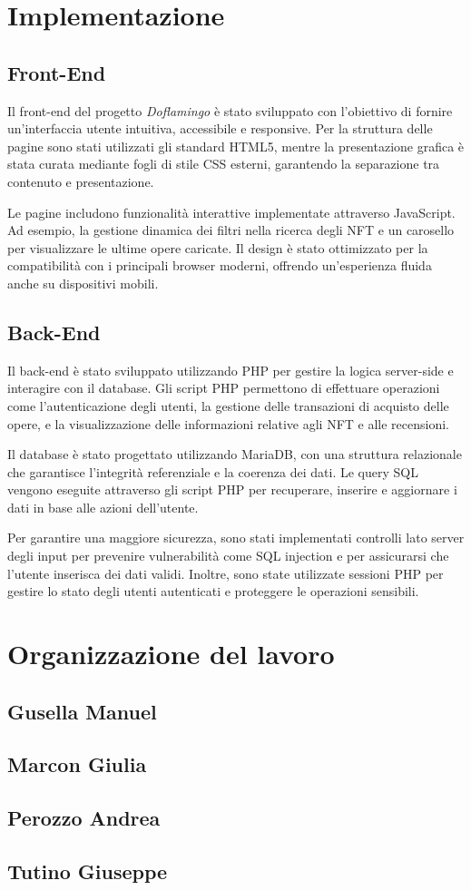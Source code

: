 \documentclass[10pt]{article}
\begin{document}
\section{Implementazione}
\subsection{Front-End}
Il front-end del progetto \textit{Doflamingo} \`e stato sviluppato con l'obiettivo di fornire un'interfaccia utente intuitiva, accessibile e responsive. Per la struttura delle pagine sono stati utilizzati gli standard HTML5, mentre la presentazione grafica \`e stata curata mediante fogli di stile CSS esterni, garantendo la separazione tra contenuto e presentazione.

Le pagine includono funzionalit\`a interattive implementate attraverso JavaScript. Ad esempio, la gestione dinamica dei filtri nella ricerca degli NFT e un carosello per visualizzare le ultime opere caricate. Il design \`e stato ottimizzato per la compatibilit\`a con i principali browser moderni, offrendo un'esperienza fluida anche su dispositivi mobili.

\subsection{Back-End}
Il back-end \`e stato sviluppato utilizzando PHP per gestire la logica server-side e interagire con il database. Gli script PHP permettono di effettuare operazioni come l'autenticazione degli utenti, la gestione delle transazioni di acquisto delle opere, e la visualizzazione delle informazioni relative agli NFT e alle recensioni.

Il database \`e stato progettato utilizzando MariaDB, con una struttura relazionale che garantisce l'integrit\`a referenziale e la coerenza dei dati. Le query SQL vengono eseguite attraverso gli script PHP per recuperare, inserire e aggiornare i dati in base alle azioni dell'utente.

Per garantire una maggiore sicurezza, sono stati implementati controlli lato server degli input per prevenire vulnerabilit\`a come SQL injection e per assicurarsi che l'utente inserisca dei dati validi. Inoltre, sono state utilizzate sessioni PHP per gestire lo stato degli utenti autenticati e proteggere le operazioni sensibili.

\section{Organizzazione del lavoro}
\subsection{Gusella Manuel}
\subsection{Marcon Giulia}
\subsection{Perozzo Andrea}
\subsection{Tutino Giuseppe}
\end{document}
